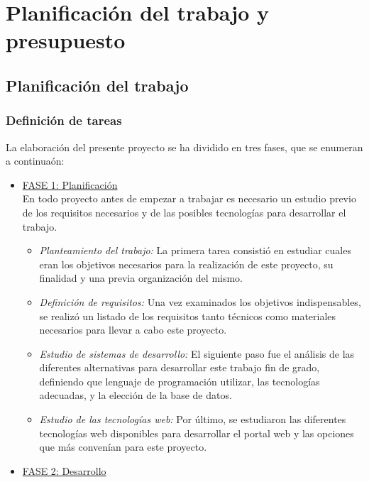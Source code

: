 \chapter{Planificación del trabajo y presupuesto}
\section{Planificación del trabajo}
\subsection{Definición de tareas}
La elaboración del presente proyecto se ha dividido en tres fases, que se enumeran a continuaón:
\begin{itemize}
  \item \underline{FASE 1: Planificación}  \hfill  \\
  En todo proyecto antes de empezar a trabajar es necesario un estudio previo de los requisitos necesarios y de las posibles tecnologías para desarrollar el trabajo.
  \begin{itemize}
    \item \textit{Planteamiento del trabajo: }La primera tarea consistió en estudiar cuales eran los objetivos necesarios para la realización de este proyecto, su finalidad y una previa organización del mismo.
    \item \textit{Definición de requisitos: }Una vez examinados los objetivos indispensables, se realizó un listado de los requisitos tanto técnicos como materiales necesarios para llevar a cabo este proyecto.
    \item \textit{Estudio de sistemas de desarrollo: } El siguiente paso fue el análisis de las diferentes
alternativas para desarrollar este trabajo fin de grado, definiendo que lenguaje de programación utilizar, las tecnologías adecuadas, y la elección de la base de datos.
    \item \textit{Estudio de las tecnologías web: } Por último, se estudiaron las diferentes tecnologías web disponibles para desarrollar el portal web y las opciones que más convenían para este proyecto.
  \end{itemize}
  \item \underline{FASE 2: Desarrollo} \hfill \\
  

\end{itemize}
